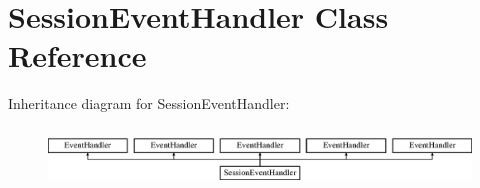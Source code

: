 \section{Session\+Event\+Handler Class Reference}
\label{class_session_event_handler}
Inheritance diagram for Session\+Event\+Handler\+:\begin{figure}[H]
\begin{center}
\leavevmode
\includegraphics[height=1.588652cm]{d4/d0b/class_session_event_handler}
\end{center}
\end{figure}
